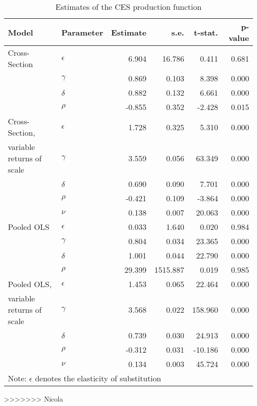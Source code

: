 \documentclass[12pt,a4paper]{article}\usepackage[]{graphicx}\usepackage[]{color}
\begin{document}
\begin{table}[ht]
\centering
\begin{tabular}{llrrrr}
  \toprule
Model & Parameter & Estimate & s.e. & t-stat. & p-value \\ 
  \midrule
Cross-Section & $\epsilon$ & 6.904 & 16.786 & 0.411 & 0.681 \\ 
   & $\gamma$ & 0.869 & 0.103 & 8.398 & 0.000 \\ 
   & $\delta$ & 0.882 & 0.132 & 6.661 & 0.000 \\ 
   & $\rho$ & -0.855 & 0.352 & -2.428 & 0.015 \\ 
   \midrule
Cross-Section, & $\epsilon$ & 1.728 & 0.325 & 5.310 & 0.000 \\ 
  variable returns of scale & $\gamma$ & 3.559 & 0.056 & 63.349 & 0.000 \\ 
   & $\delta$ & 0.690 & 0.090 & 7.701 & 0.000 \\ 
   & $\rho$ & -0.421 & 0.109 & -3.864 & 0.000 \\ 
   & $\nu$ & 0.138 & 0.007 & 20.063 & 0.000 \\ 
   \midrule
Pooled OLS & $\epsilon$ & 0.033 & 1.640 & 0.020 & 0.984 \\ 
   & $\gamma$ & 0.804 & 0.034 & 23.365 & 0.000 \\ 
   & $\delta$ & 1.001 & 0.044 & 22.790 & 0.000 \\ 
   & $\rho$ & 29.399 & 1515.887 & 0.019 & 0.985 \\ 
   \midrule
Pooled OLS, & $\epsilon$ & 1.453 & 0.065 & 22.464 & 0.000 \\ 
  variable returns of scale & $\gamma$ & 3.568 & 0.022 & 158.960 & 0.000 \\ 
   & $\delta$ & 0.739 & 0.030 & 24.913 & 0.000 \\ 
   & $\rho$ & -0.312 & 0.031 & -10.186 & 0.000 \\ 
   & $\nu$ & 0.134 & 0.003 & 45.724 & 0.000 \\ 
   \midrule 
 \multicolumn{5}{l}{\footnotesize{Note: $\epsilon$ denotes the elasticity of substitution}} \\ 
 \bottomrule
\end{tabular}
\caption{Estimates of the CES production function} 
\label{tab:ces}
\end{table}
>>>>>>> Nicola

\end{document}
